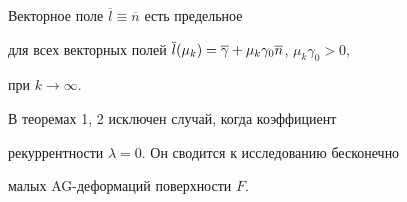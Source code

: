 \begin{cornonum}


Векторное поле $\overline l \equiv \overline n $ есть предельное 


для всех векторных полей $\overline l ({\mu_k }) =\linebreak


\overline \gamma+\mu_k \gamma_0 \overline n $, $\mu_k \gamma_0 > 0$,


при $k \to \infty $.


\end{cornonum}





\begin{notenonum}


В теоремах 1, 2 исключен случай, когда коэффициент 


рекуррентности $\lambda=0$. Он сводится к исследованию бесконечно 


малых AG-деформаций поверхности $F$.


\end{notenonum}





